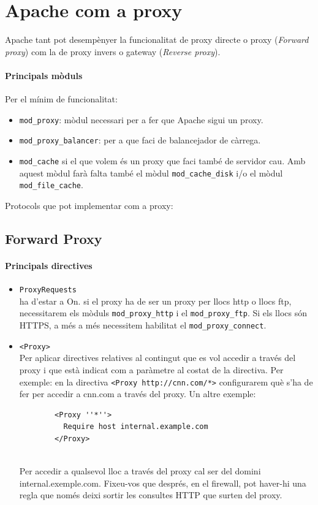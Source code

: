 \documentclass[a4paper, 11pt]{article}
\begin{document}
\section{Apache com a proxy}
Apache tant pot desempènyer la funcionalitat de proxy directe o proxy (\textit{Forward proxy}) com la de proxy invers o gateway (\textit{Reverse proxy}).

\paragraph{Principals mòduls \\}
Per el mínim de funcionalitat:
\begin{itemize}
	\item \verb+mod_proxy+: mòdul necessari per a fer que Apache sigui un proxy. 
	\item \verb+mod_proxy_balancer+: per a que faci de balancejador de càrrega.
	\item \verb+mod_cache+ si el que volem \'es un proxy que faci tamb\'e de servidor cau. Amb aquest mòdul farà falta tamb\'e el mòdul \verb+mod_cache_disk+ i/o el mòdul \verb+mod_file_cache+.
\end{itemize}

Protocols que pot implementar com a proxy:


\subsection{Forward Proxy}

\paragraph{Principals directives\\}
\begin{itemize}
	\item \verb+ProxyRequests+ \\
		ha d'estar a On. si el proxy ha de ser un proxy per llocs http o llocs ftp, necessitarem els mòduls \verb+mod_proxy_http+ i el \verb+mod_proxy_ftp+. Si els llocs són HTTPS, a m\'es a m\'es necessitem habilitat el \verb+mod_proxy_connect+.
	\item \verb+<Proxy>+\\
		Per aplicar directives relatives al contingut que es vol accedir a trav\'es del proxy i que està indicat com a paràmetre al costat de la directiva. Per exemple: en la directiva \verb+<Proxy http://cnn.com/*>+ configurarem què s'ha de fer per accedir a cnn.com a trav\'es del proxy. Un altre exemple: 
		\begin{verbatim}
		<Proxy ''*''>
		  Require host internal.example.com
		</Proxy>
		\end{verbatim}
		\\
		Per accedir a qualsevol lloc a trav\'es del proxy cal ser del domini internal.exemple.com. Fixeu-vos que despr\'es, en el firewall, pot haver-hi una regla que nom\'es deixi sortir les consultes HTTP que surten del proxy.
\end{itemize}
\end{document}
